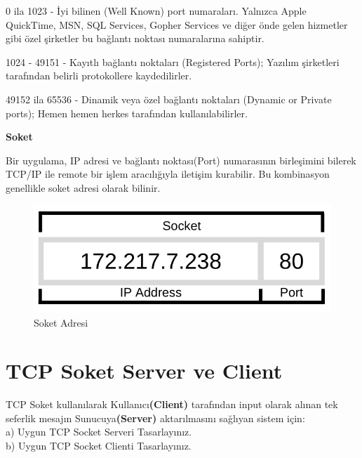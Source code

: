 0 ila 1023 - İyi bilinen (Well Known) port numaraları. Yalnızca Apple QuickTime, MSN, SQL Services, Gopher Services ve diğer önde gelen hizmetler gibi özel şirketler bu bağlantı noktası numaralarına sahiptir.

1024 - 49151 - Kayıtlı bağlantı noktaları (Registered Ports); Yazılım şirketleri tarafından belirli protokollere kaydedilirler.

49152 ila 65536 - Dinamik veya özel bağlantı noktaları (Dynamic or Private ports); Hemen hemen herkes tarafından kullanılabilirler.


\vspace{20mm}
\textbf{Soket}
\vspace{5mm}

Bir uygulama, IP adresi ve bağlantı noktası(Port) numarasının birleşimini bilerek TCP/IP ile remote bir işlem aracılığıyla iletişim kurabilir. Bu kombinasyon genellikle soket adresi olarak bilinir.

\begin{figure}[!htb]
    \centering
    \includegraphics[width=1\linewidth]{00-images/15-socket_address.png}
    \caption{Soket Adresi}
    \label{fig:my_label}
\end{figure}


\section{TCP Soket Server ve Client}

\begin{question}
TCP Soket kullanılarak Kullanıcı\textbf{(Client)} tarafından input olarak alınan tek seferlik mesajın Sunucuya\textbf{(Server)} aktarılmasını sağlıyan sistem için:
	\\ a) Uygun TCP Socket Serveri Tasarlayınız.
	\\ b) Uygun TCP Socket Clienti Tasarlayınız. 
\end{question}

